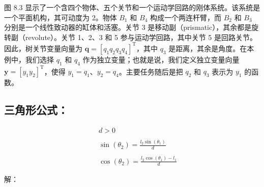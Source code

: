 \documentclass[10pt,a4paper]{book}
\theoremstyle{thmstyle} %
\theoremstyle{defstyle} %
\theoremstyle{prostyle} %
\begin{document}
图 8.3 显示了一个含四个物体、五个关节和一个运动学回路的刚体系统。该系统是一个平面机构，其可动度为 2。物体 $B_{1}$ 和 $B_{4}$ 构成一个两连杆臂，而 $B_{2}$ 和 $B_{3}$ 分别是一个线性致动器的缸体和活塞。关节 3 是移动副（prismatic），其余都是旋转副（revolute）。关节 1、2、3 和 5 参与运动学回路，其中关节 5 是回路关节。因此，树关节变量向量为 $\boldsymbol{q}=[q_{1} q_{2} q_{3} q_{4}]^{\mathrm{T}}$，其中 $q_{3}$ 是距离，其余是角度。在本例中，我们选择 $q_{1}$ 和 $q_{4}$ 作为独立变量；也就是说，我们定义独立变量向量 $\boldsymbol{y}=[y_{1} y_{2}]^{\mathrm{T}}$，使得 $y_{1}=q_{1}$、$y_{2}=q_{4}$。主要任务随后是把 $q_{2}$ 和 $q_{3}$ 表示为 $y_{1}$ 的函数。





\subsection{三角形公式：}





$$
\begin{array}{rlr} & { } & { d > 0 } \\& { } & { } \\& { } & { \sin ( \theta _ { 2 } ) = \frac { l _ { 2 } \sin ( \theta _ { 1 } ) } { d } } \\& { } & { } \\& { } & { \cos ( \theta _ { 2 } ) = \frac { l _ { 2 } \cos ( \theta _ { 1 } ) - l _ { 1 } } { d } } \end{array}
$$



解：
\end{document}
